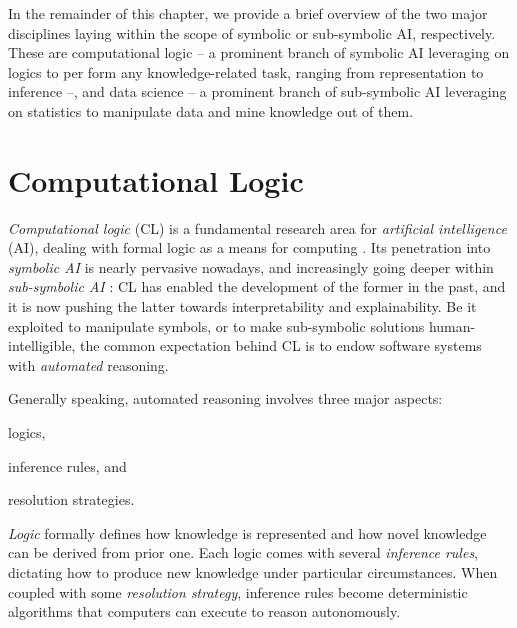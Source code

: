 \documentclass[12pt,a4paper,openright,twoside]{book}
\begin{document}
In the remainder of this chapter, we provide a brief overview of the two major disciplines laying within the scope of symbolic or sub-symbolic AI, respectively.
%
These are computational logic -- a prominent branch of symbolic AI leveraging on logics to per form any knowledge-related task, ranging from representation to inference --, and data science -- a prominent branch of sub-symbolic AI leveraging on statistics to manipulate data and mine knowledge out of them.

\section{Computational Logic}

\emph{Computational logic} (CL) \cite{lloyd1990computational} is a fundamental research area for \emph{artificial intelligence} (AI), dealing with formal logic as a means for computing \cite{Paulson2018}.
%
Its penetration into \emph{symbolic AI} is nearly pervasive nowadays, and increasingly going deeper within \emph{sub-symbolic AI} \cite{xaisurvey-ia14,lptech4mas-jaamas35}: CL has enabled the development of the former in the past, and it is now pushing the latter towards interpretability and explainability.
%
Be it exploited to manipulate symbols, or to make sub-symbolic solutions human-intelligible, the common expectation behind CL is to endow software systems with \emph{automated} reasoning.

Generally speaking, automated reasoning involves three major aspects:
%
\begin{inlinelist}
    \item logics,
    \item inference rules, and
    \item resolution strategies.
\end{inlinelist}

\emph{Logic} formally defines how knowledge is represented and how novel knowledge can be derived from prior one.
%
Each logic comes with several \emph{inference rules}, dictating how to produce new knowledge under particular circumstances.
%
When coupled with some \emph{resolution strategy}, inference rules become deterministic algorithms that computers can execute to reason autonomously.
\end{document}
